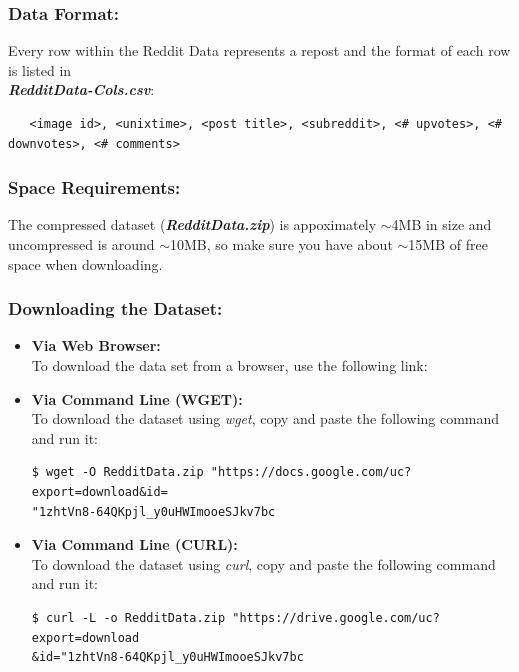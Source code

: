 \documentclass{article}
\begin{document}
\subsubsection*{Data Format:}
Every row within the Reddit Data represents a repost and the format of each row is listed in \\ \textbf{\textit{RedditData-Cols.csv}}:
\small
\begin{verbatim}
   <image id>, <unixtime>, <post title>, <subreddit>, <# upvotes>, <# downvotes>, <# comments>
\end{verbatim}
\normalsize

\subsubsection*{Space Requirements:}
The compressed dataset (\textbf{\textit{RedditData.zip}}) is appoximately $\sim$4MB in size and uncompressed is around $\sim$10MB, so make sure you have about $\sim$15MB of free space when downloading.

\subsubsection*{Downloading the Dataset:}
\begin{itemize}
    \item \textbf{Via Web Browser:}\\
        To download the data set from a browser, use the following link:
        \begin{center}
        \href{https://drive.google.com/uc?export=download&id=1zhtVn8-64QKpjl_y0uHWImooeSJkv7bc}{\color{blue}{https://drive.google.com/uc?export=download\&id=1zhtVn8-64QKpjl\_y0uHWImooeSJkv7bc}}
        \end{center}
    \item \textbf{Via Command Line (WGET):}\\
        To download the dataset using \textit{wget}, copy and paste the following command and run it:
        \begin{commandline}\begin{verbatim}$ wget -O RedditData.zip "https://docs.google.com/uc?export=download&id=
"1zhtVn8-64QKpjl_y0uHWImooeSJkv7bc\end{verbatim}\end{commandline}
    \item \textbf{Via Command Line (CURL):}\\
        To download the dataset using \textit{curl}, copy and paste the following command and run it:
        \begin{commandline}\begin{verbatim}$ curl -L -o RedditData.zip "https://drive.google.com/uc?export=download
&id="1zhtVn8-64QKpjl_y0uHWImooeSJkv7bc\end{verbatim}\end{commandline}
\end{itemize}
\end{document}
